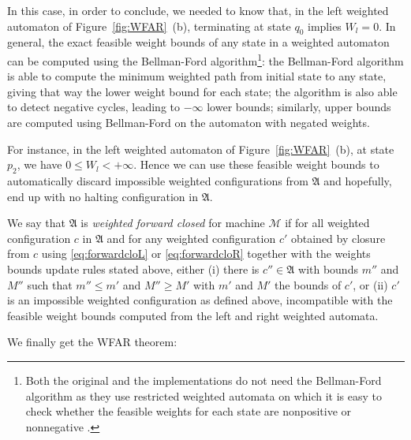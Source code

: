 In this case, in order to conclude, we needed to know that, in the left weighted automaton of Figure~\ref{fig:WFAR}~(b), terminating at state $q_0$ implies $W_l = 0$. In general, the exact feasible weight bounds of any state in a weighted automaton can be computed using the Bellman-Ford algorithm\footnote{Both the original and the \CoqBB implementations do not need the Bellman-Ford algorithm as they use restricted weighted automata on which it is easy to check whether the feasible weights for each state are nonpositive or nonnegative \cite{iijil1_2025_14914502}.}: the Bellman-Ford algorithm is able to compute the minimum weighted path from initial state to any state, giving that way the lower weight bound for each state; the algorithm is also able to detect negative cycles, leading to $-\infty$ lower bounds; similarly, upper bounds are computed using Bellman-Ford on the automaton with negated weights.

For instance, in the left weighted automaton of Figure~\ref{fig:WFAR}~(b), at state $p_2$, we have $0 \leq W_l < +\infty$. Hence we can use these feasible weight bounds to automatically discard impossible weighted configurations from $\mathfrak{A}$ and hopefully, end up with no halting configuration in $\mathfrak{A}$.

We say that $\mathfrak{A}$ is \textit{weighted forward closed} for machine $\mathcal{M}$ if for all weighted configuration $c$ in $\mathfrak{A}$ and for any weighted configuration $c'$ obtained by closure from $c$ using \eqref{eq:forwardcloL} or \eqref{eq:forwardcloR} together with the weights bounds update rules stated above, either (i) there is $c'' \in \mathfrak{A}$ with bounds $m''$ and $M''$ such that $m'' \leq m'$ and $M'' \geq M'$ with $m'$ and $M'$ the bounds of $c'$, or (ii) $c'$ is an impossible weighted configuration as defined above, \ie incompatible with the feasible weight bounds computed from the left and right weighted automata.


We finally get the WFAR theorem:

